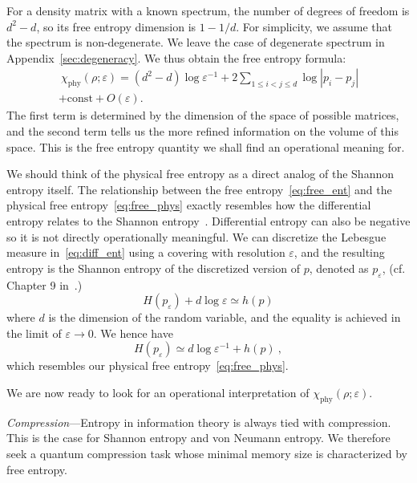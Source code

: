 \documentclass[aps,pre,twocolumn,superscriptaddress,amsmath,amssymb,reprint]{revtex4-2}
\def\eps{\varepsilon}
\begin{document}
For a density matrix with a known spectrum, the number of degrees of freedom is $d^2-d$, so its free entropy dimension is $1-1/d$. For simplicity, we assume that the spectrum is non-degenerate. We leave the case of degenerate spectrum in Appendix~\ref{sec:degeneracy}.  We thus obtain the free entropy formula:
\begin{multline}~\label{eq:free_phys1}
    \chi_\mathrm{phy}(\rho;\eps)=(d^2-d)\log\eps^{-1} +2\sum_{1\le i< j\le d} \log|p_i-p_j|\\ + \mathrm{const} + O(\eps).
\end{multline}
The first term is determined by the dimension of the space of possible matrices, and the second term tells us the more refined information on the volume of this space. This is the free entropy quantity we shall find an operational meaning for. 

We should think of the physical free entropy as a direct analog of the Shannon entropy itself. The relationship between the free entropy~\eqref{eq:free_ent} and the physical free entropy~\eqref{eq:free_phys} exactly resembles how the differential entropy relates to the Shannon entropy~\cite{kolmogorov1956shannon,renyi1959dimension,jaynes1957information,cover1999elements}. Differential entropy can also be negative so it is not directly operationally meaningful. We can discretize the Lebesgue measure in~\eqref{eq:diff_ent} using a covering with resolution $\eps$, and the resulting entropy is the Shannon entropy of the discretized version of $p$, denoted as $ p_\eps$, (cf. Chapter 9 in~\cite{cover1999elements}.)
\begin{equation}
   H( p_\eps) + d\log \eps \simeq h(p) 
\end{equation}
where $d$ is the dimension of the random variable, and the equality is achieved in the limit of $\eps\to 0$. We hence have
\begin{equation}
    H( p_\eps)\simeq d\log \eps^{-1} + h(p)\ ,
\end{equation}
which resembles our physical free entropy~\eqref{eq:free_phys}. 

We are now ready to look for an operational interpretation of $\chi_\mathrm{phy}(\rho;\eps)$.

\emph{Compression}---Entropy in information theory is always tied with compression. This is the case for Shannon entropy and von Neumann entropy. We therefore seek a quantum compression task whose minimal memory size is characterized by free entropy.
\end{document}
